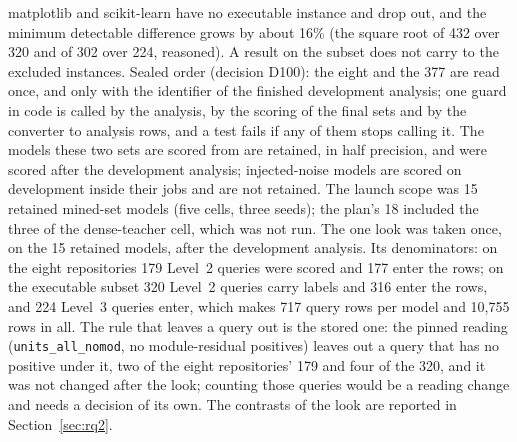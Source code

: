 \documentclass[10pt,twocolumn]{article}
\begin{document}
matplotlib and scikit-learn have no executable instance and drop out, and the minimum detectable difference grows by about 16\% (the square root of 432 over 320 and of 302 over 224, reasoned). %
A result on the subset does not carry to the excluded instances.
Sealed order (decision D100): the eight and the 377 are read once, and only with the identifier of the finished development analysis; one guard in code is called by the analysis, by the scoring of the
final sets and by the converter to analysis rows, and a test fails if any of them stops calling it. %
The models these two sets are scored from are retained, in half precision, and were scored after the development analysis; injected-noise models are scored on
development inside their jobs and are not retained. The launch scope was 15 retained mined-set models (five cells, three seeds); the plan's 18 included the three of the dense-teacher cell, which was not run. %
The one look was taken once, on the 15 retained models, after the development analysis. Its denominators: on the eight repositories 179 Level~2 queries were scored and 177 enter the rows; on the executable subset
320 Level~2 queries carry labels and 316 enter the rows, and 224 Level~3 queries enter, which makes 717 query rows per model and 10,755 rows in all. %
The rule that leaves a query out is the stored one: the pinned reading (\texttt{units\_all\_nomod}, no module-residual positives) leaves out a query that has no positive under it, two of the eight repositories' 179 and four of the 320, and it was not changed after the look;
counting those queries would be a reading change and needs a decision of its own. %
The contrasts of the look are reported in Section~\ref{sec:rq2}.


\end{document}
